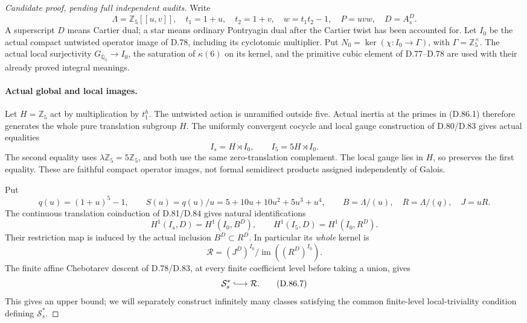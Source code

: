 \begin{proof}[Candidate proof, pending full independent audits]
Write
\[
 \Lambda=\mathbb Z_5[[u,v]],\quad t_1=1+u,\quad t_2=1+v,
 \quad w=t_1t_2-1,\quad P=uvw,\quad D=A_s^D.
\]
A superscript \(D\) means Cartier dual; a star means ordinary
Pontryagin dual after the Cartier twist has been accounted for.
Let \(I_0\) be the actual compact untwisted operator image of
D.78, including its cyclotomic multiplier. Put
\(N_0=\ker(\chi:I_0\to\Gamma)\), with
\(\Gamma=\mathbb Z_5^\times\). The actual local surjectivity
\(G_{\mathbb Q_5}\to I_0\), the saturation of \(\kappa(6)\)
on its kernel, and the primitive cubic element of D.77--D.78
are used with their already proved integral meanings.

\paragraph{Actual global and local images.}
Let \(H=\mathbb Z_5\) act by multiplication by \(t_1^h\).
The untwisted action is unramified outside five. Actual inertia
at the primes in (D.86.1) therefore generates the whole pure
translation subgroup \(H\). The uniformly convergent cocycle
and local gauge construction of D.80/D.83 gives actual equalities
\[
              I_s=H\rtimes I_0,
       \qquad I_5=5H\rtimes I_0.                       \tag{D.86.3}
\]
The second equality uses \(\lambda\mathbb Z_5=5\mathbb Z_5\),
and both use the same zero-translation complement. The local
gauge lies in \(H\), so preserves the first equality. These
are faithful compact operator images, not formal semidirect
products assigned independently of Galois.

Put
\[
 q(u)=(1+u)^5-1,
 \qquad S(u)=q(u)/u=5+10u+10u^2+5u^3+u^4,
 \qquad B=\Lambda/(u),\quad R=\Lambda/(q),\quad J=uR.
                                                               \tag{D.86.4}
\]
The continuous translation coinduction of D.81/D.84 gives
natural identifications
\[
 H^1(I_s,D)=H^1(I_0,B^D),\qquad
 H^1(I_5,D)=H^1(I_0,R^D).                               \tag{D.86.5}
\]
Their restriction map is induced by the actual inclusion
\(B^D\subset R^D\). In particular its \emph{whole} kernel is
\[
 \mathcal R=(J^D)^{I_0}/\operatorname{im}((R^D)^{I_0}). \tag{D.86.6}
\]
The finite affine Chebotarev descent of D.78/D.83, at every
finite coefficient level before taking a union, gives
\[
                         \mathcal S_s^*\lhook\joinrel\longrightarrow
                         \mathcal R.                  \tag{D.86.7}
\]
This gives an upper bound; we will separately construct
infinitely many classes satisfying the common finite-level
local-triviality condition defining \(\mathcal S_s^*\).


\end{proof}
